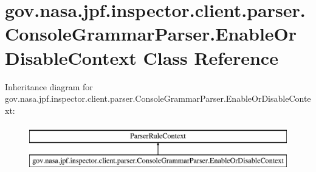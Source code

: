 \hypertarget{classgov_1_1nasa_1_1jpf_1_1inspector_1_1client_1_1parser_1_1_console_grammar_parser_1_1_enable_or_disable_context}{}\section{gov.\+nasa.\+jpf.\+inspector.\+client.\+parser.\+Console\+Grammar\+Parser.\+Enable\+Or\+Disable\+Context Class Reference}
\label{classgov_1_1nasa_1_1jpf_1_1inspector_1_1client_1_1parser_1_1_console_grammar_parser_1_1_enable_or_disable_context}
Inheritance diagram for gov.\+nasa.\+jpf.\+inspector.\+client.\+parser.\+Console\+Grammar\+Parser.\+Enable\+Or\+Disable\+Context\+:\begin{figure}[H]
\begin{center}
\leavevmode
\includegraphics[height=2.000000cm]{classgov_1_1nasa_1_1jpf_1_1inspector_1_1client_1_1parser_1_1_console_grammar_parser_1_1_enable_or_disable_context}
\end{center}
\end{figure}
